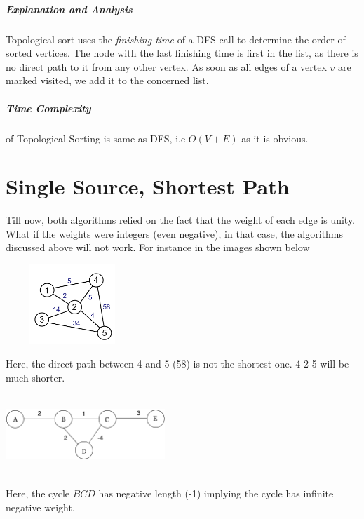 \documentclass[11pt,a4paper]{extarticle}
\begin{document}
\begin{adjustwidth}{2.5em}{0pt}

\end{adjustwidth}

\subparagraph{Explanation and Analysis}
Topological sort uses the \textit{finishing time} of a DFS call to determine the order of sorted vertices. The node with the last finishing time is first in the list, as there is no direct path to it from any other vertex. As soon as all edges of a vertex $v$ are marked visited, we add it to the concerned list.

\subparagraph{Time Complexity}
of Topological Sorting is same as DFS, i.e $O(V+E)$ as it is obvious.

\section{Single Source, Shortest Path}
Till now, both algorithms relied on the fact that the weight of each edge is unity. What if the weights were integers (even negative), in that case, the algorithms discussed above will not work. For instance in the images shown below

\begin{multicols}{2}

\begin{center}
	\includegraphics[width=5cm, height=3cm]{shortest}
\end{center}
Here, the direct path between 4 and 5 (58) is not the shortest one. 4-2-5 will be much shorter.

\columnbreak

\begin{center}
	\includegraphics[width=6cm, height=3cm]{negative}
\end{center}

Here, the cycle $BCD$ has negative length (-1) implying the cycle has infinite negative weight.

\end{multicols}
\end{document}

